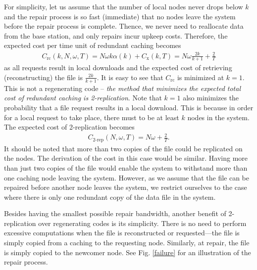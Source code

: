 \documentclass[10pt,conference]{IEEEtran}
\begin{document}
For simplicity, let us assume that the number of local nodes never drops below $k$ and the repair process is so fast (immediate) that no nodes leave the system before the repair process is complete. Thence, we never need to reallocate data from the base station, and only repairs incur upkeep costs. Therefore, the expected cost per time unit of redundant caching becomes
\begin{align}
C_{\text{rc}}(k,N,\omega,T) = N\omega k \alpha(k)+ C_{\text{x}}(k,T) = N\omega \frac{2k}{k+1} + \frac{2}{T}
\nonumber
\end{align}
as all requests result in local downloads and the expected cost of retrieving (reconstructing) the file is $\frac{2k}{k+1}$. It is easy to see that $C_{\text{rc}}$ is minimized at $k=1$. This is not a regenerating code -- \emph{the method that minimizes the expected total cost of redundant caching is 2-replication}. Note that $k{=}1$ also minimizes the probability that a file request results in a local download. This is because in order for a local request to take place, there must to be at least $k$ nodes in the system. The expected cost of 2-replication becomes
\begin{align}
C_{\text{2-rep}}(N,\omega,T) = N\omega + \frac{2}{T}.
\label{rep}
\end{align}
It should be noted that more than two copies of the file could be replicated on the nodes. The derivation of the cost in this case would be similar. Having more than just two copies of the file would enable the system to withstand more than one caching node leaving the system. However, as we assume that the file can be repaired before another node leaves the system, we restrict ourselves to the case where there is only one redundant copy of the data file in the system.

Besides having the smallest possible repair bandwidth, another benefit of 2-replication over regenerating codes is its simplicity. There is no need to perform excessive computations when the file is reconstructed or requested---the file is simply copied from a caching to the requesting node. Similarly, at repair, the file is simply copied to the newcomer node. See Fig. \ref{failure} for an illustration of the repair process.
\end{document}
